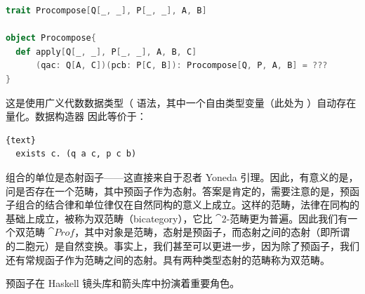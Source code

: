 \begin{lstlisting}[language=Scala]
trait Procompose[Q[_, _], P[_, _], A, B]

object Procompose{
  def apply[Q[_, _], P[_, _], A, B, C]
      (qac: Q[A, C])(pcb: P[C, B]): Procompose[Q, P, A, B] = ???
}
\end{lstlisting}
这是使用广义代数数据类型（ 语法，其中一个自由类型变量（此处为 ）自动存在量化。数据构造器  因此等价于：

\begin{lstlisting}{text}
  exists c. (q a c, p c b)
\end{lstlisting}
组合的单位是态射函子——这直接来自于忍者 Yoneda 引理。因此，有意义的是，问是否存在一个范畴，其中预函子作为态射。答案是肯定的，需要注意的是，预函子组合的结合律和单位律仅在自然同构的意义上成立。这样的范畴，法律在同构的基础上成立，被称为双范畴（bicategory），它比 $\cat{2}$-范畴更为普遍。因此我们有一个双范畴 $\cat{Prof}$，其中对象是范畴，态射是预函子，而态射之间的态射（即所谓的二胞元）是自然变换。事实上，我们甚至可以更进一步，因为除了预函子，我们还有常规函子作为范畴之间的态射。具有两种类型态射的范畴称为双范畴。

预函子在 Haskell 镜头库和箭头库中扮演着重要角色。
